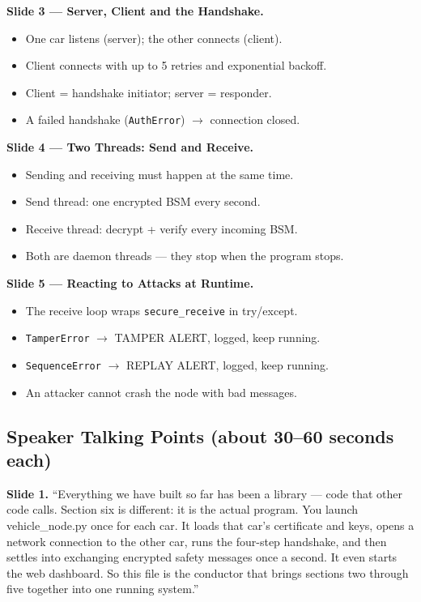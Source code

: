 \documentclass[11pt,a4paper]{article}
\begin{document}
\textbf{Slide 3 --- Server, Client and the Handshake.}
\begin{itemize}
  \item One car listens (server); the other connects (client).
  \item Client connects with up to 5 retries and exponential backoff.
  \item Client = handshake initiator; server = responder.
  \item A failed handshake (\texttt{AuthError}) $\to$ connection closed.
\end{itemize}

\textbf{Slide 4 --- Two Threads: Send and Receive.}
\begin{itemize}
  \item Sending and receiving must happen at the same time.
  \item Send thread: one encrypted BSM every second.
  \item Receive thread: decrypt + verify every incoming BSM.
  \item Both are daemon threads --- they stop when the program stops.
\end{itemize}

\textbf{Slide 5 --- Reacting to Attacks at Runtime.}
\begin{itemize}
  \item The receive loop wraps \texttt{secure\_receive} in try/except.
  \item \texttt{TamperError} $\to$ TAMPER ALERT, logged, keep running.
  \item \texttt{SequenceError} $\to$ REPLAY ALERT, logged, keep running.
  \item An attacker cannot crash the node with bad messages.
\end{itemize}

\subsection{Speaker Talking Points (about 30--60 seconds each)}

\textbf{Slide 1.} ``Everything we have built so far has been a library --- code
that other code calls. Section six is different: it is the actual program. You
launch vehicle\_node.py once for each car. It loads that car's certificate and
keys, opens a network connection to the other car, runs the four-step handshake,
and then settles into exchanging encrypted safety messages once a second. It even
starts the web dashboard. So this file is the conductor that brings sections two
through five together into one running system.''
\end{document}
